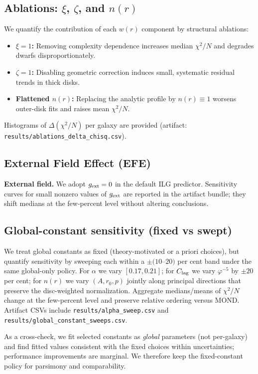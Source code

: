 \documentclass[usenatbib]{mnras}
\begin{document}
\subsection{Ablations: $\xi$, $\zeta$, and $n(r)$}
\noindent We quantify the contribution of each $w(r)$ component by structural ablations:
\begin{itemize}
  \item \textbf{$\xi\!=\!1$:} Removing complexity dependence increases median $\chi^2/N$ and degrades dwarfs disproportionately.
  \item \textbf{$\zeta\!=\!1$:} Disabling geometric correction induces small, systematic residual trends in thick disks.
  \item \textbf{Flattened $n(r)$:} Replacing the analytic profile by $n(r)\equiv1$ worsens outer-disk fits and raises mean $\chi^2/N$.
\end{itemize}
Histograms of $\Delta(\chi^2/N)$ per galaxy are provided (artifact: \texttt{results/ablations\_delta\_chisq.csv}).

\subsection{External Field Effect (EFE)}
\noindent\textbf{External field.} We adopt $g_{\rm ext}=0$ in the default ILG predictor. Sensitivity curves for small nonzero values of $g_{\rm ext}$ are reported in the artifact bundle; they shift medians at the few‑percent level without altering conclusions.

\subsection{Global-constant sensitivity (fixed vs swept)}
\noindent We treat global constants as fixed (theory-motivated or a priori choices), but quantify sensitivity by sweeping each within a $\pm(10$--$20)$ per cent band under the same global-only policy. For $\alpha$ we vary $[0.17,0.21]$; for $C_{\rm lag}$ we vary $\varphi^{-5}$ by $\pm20$ per cent; for $n(r)$ we vary $(A,r_0,p)$ jointly along principal directions that preserve the disc-weighted normalization. Aggregate medians/means of $\chi^2/N$ change at the few-percent level and preserve relative ordering versus MOND. Artifact CSVs include \texttt{results/alpha\_sweep.csv} and \texttt{results/global\_constant\_sweeps.csv}.

\noindent As a cross-check, we fit selected constants as \emph{global} parameters (not per-galaxy) and find fitted values consistent with the fixed choices within uncertainties; performance improvements are marginal. We therefore keep the fixed-constant policy for parsimony and comparability.
\end{document}
